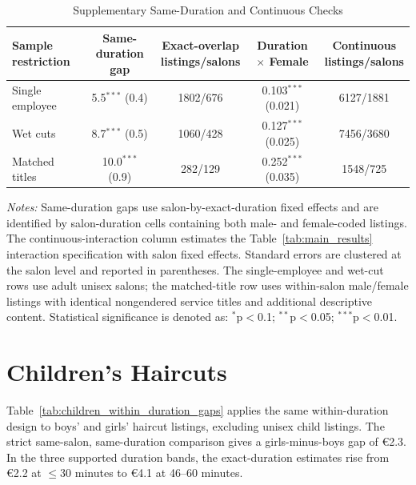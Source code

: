\documentclass[12pt,a4paper]{article}
\begin{document}
\begin{table}[htbp]
  \centering
  \caption{Supplementary Same-Duration and Continuous Checks}
  \label{tab:combined_robustness_results}
  \footnotesize

\begin{tabular}{lcccc}
\hline
Sample restriction & Same-duration gap & \makecell{Exact-overlap\\listings/salons} & Duration $\times$ Female & \makecell{Continuous\\listings/salons} \\
\hline
Single employee & 5.5$^{***}$ (0.4) & 1802/676 & 0.103$^{***}$ (0.021) & 6127/1881 \\
Wet cuts & 8.7$^{***}$ (0.5) & 1060/428 & 0.127$^{***}$ (0.025) & 7456/3680 \\
Matched titles & 10.0$^{***}$ (0.9) & 282/129 & 0.252$^{***}$ (0.035) & 1548/725 \\
\hline
\end{tabular}

  \begin{minipage}{0.96\linewidth}
      \footnotesize
      \textit{Notes:} Same-duration gaps use salon-by-exact-duration fixed effects and are identified by salon-duration cells containing both male- and female-coded listings.
      The continuous-interaction column estimates the Table~\ref{tab:main_results} interaction specification with salon fixed effects.
      Standard errors are clustered at the salon level and reported in parentheses.
      The single-employee and wet-cut rows use adult unisex salons; the matched-title row uses within-salon male/female listings with identical nongendered service titles and additional descriptive content.
      Statistical significance is denoted as: $^{*}$p$<$0.1; $^{**}$p$<$0.05; $^{***}$p$<$0.01.
  \end{minipage}\end{table}

\newpage
\section{Children's Haircuts}
\label{app:children}

Table~\ref{tab:children_within_duration_gaps} applies the same within-duration design to boys' and girls' haircut listings, excluding unisex child listings. The strict same-salon, same-duration comparison gives a girls-minus-boys gap of €2.3. In the three supported duration bands, the exact-duration estimates rise from €2.2 at $\leq$30 minutes to €4.1 at 46--60 minutes.
\end{document}
